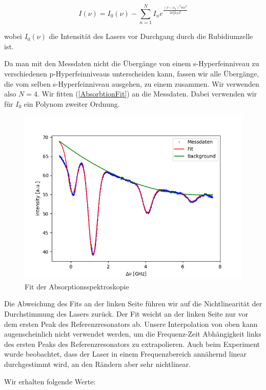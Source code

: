 \documentclass[a4paper,parskip]{scrartcl}
\begin{document}
\begin{equation}
I(\nu) = I_0(\nu) - \sum_{n=1}^N I_n e^{\frac{(\nu-\nu_n)^2mc^2}{2\nu_0^2 k_B T}}
\label{AbsorbtionFit}
\end{equation}

wobei $I_0(\nu)$ die Intensität des Lasers vor Durchgang durch die Rubidiumzelle ist.

Da man mit den Messdaten nicht die Übergänge von einem s-Hyperfeinniveau zu verschiedenen p-Hyperfeinniveaus unterscheiden kann, fassen wir alle Übergänge, die vom selben s-Hyperfeinniveau ausgehen, zu einem zusammen. Wir verwenden also $N=4$. Wir fitten (\ref{AbsorbtionFit}) an die Messdaten. Dabei verwenden wir für $I_0$ ein Polynom zweiter Ordnung.

\begin{figure}[h]
\centering
\includegraphics[scale = 0.5]{./absorbtion/fit.png}
\caption{Fit der Absorptionsspektroskopie}
\end{figure}

Die Abweichung des Fits an der linken Seite führen wir auf die Nichtlinearität der Durchstimmung des Lasers zurück. Der Fit weicht an der linken Seite nur vor dem ersten Peak des Referenzresonators ab. Unsere Interpolation von oben kann augenscheinlich nicht verwendet werden, um die Frequenz-Zeit Abhängigkeit links des ersten Peaks des Referenzresonators zu extrapolieren. Auch beim Experiment wurde beobachtet, dass der Laser in einem Frequenzbereich annähernd linear durchgestimmt wird, an den Rändern aber sehr nichtlinear.

Wir erhalten folgende Werte:
\end{document}
